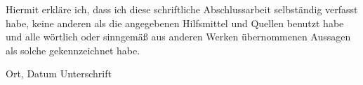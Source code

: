 \documentclass[12pt,a4paper]{report}
\begin{document}
Hiermit erkläre ich, dass ich diese schriftliche Abschlussarbeit selbständig verfasst habe, keine anderen als die angegebenen Hilfsmittel und Quellen benutzt habe und alle wörtlich oder sinngemäß aus anderen Werken übernommenen Aussagen als solche gekennzeichnet habe.

\vskip 3cm

Ort, Datum	\hfill Unterschrift \hfill



\renewcommand{\baselinestretch}{1.3}
\small\normalsize

\tableofcontents

\renewcommand{\baselinestretch}{1}
\small\normalsize

\newpage


\setcounter{page}{1}


\newpage


\newpage


\newpage


\newpage


\newpage


\newpage





\end{document}
